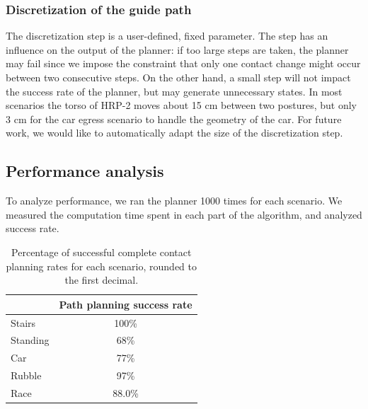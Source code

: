 \documentclass[journal]{IEEEtran}
\begin{document}
\subsubsection{Discretization of the guide path} \label{sec:disc}
The discretization step is a user-defined, fixed parameter. The step
has an influence on the output of the planner: if too large steps are taken,
the planner may fail since we impose the constraint that only one contact change might occur
between two consecutive steps. On the other hand, a small step will not impact the success rate of the planner, 
but may generate unnecessary states. In most scenarios the torso of HRP-2 moves about 15 cm between two postures, but only 3 cm
for the car egress scenario to handle the geometry of the car.
For future work, we would like to automatically adapt the size of the discretization step.

\subsection{Performance analysis} \label{sec:perf}
To analyze performance, we ran the planner 1000 times for each scenario.
We measured the computation time spent in each part of the algorithm, and analyzed success rate.




\begin{table}
\centering
\begin{tabular}{ l | c}
  &  Path planning success rate \\
 \hline
   Stairs     	& 100\% \\
   Standing			& 68\% 	\\
   Car 			& 77\% 	\\
   Rubble 				& 97\% 	\\
   Race        & 88.0\% 	\\
 \end{tabular}
\caption{ Percentage of successful complete contact planning rates for each scenario, rounded to the first decimal.}
\label{tab:sucess_planning}
\quad
\end{table}
\end{document}
